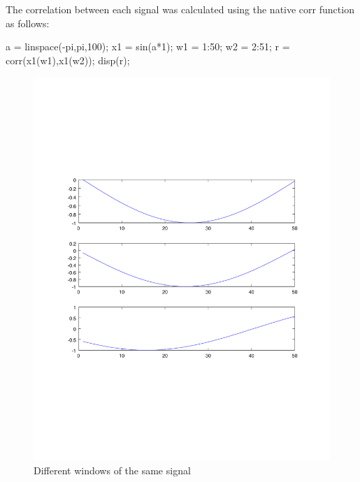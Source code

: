 The correlation between each signal was calculated using the native corr function as follows:

\begin{Matlab}
a = linspace(-pi,pi,100); %
x1  = sin(a*1); %
w1 = 1:50;
w2 = 2:51;
r = corr(x1(w1),x1(w2));
disp(r);
\end{Matlab}



\begin{figure}
\centering
\includegraphics[scale=0.4]{Figures/lofreq}
\caption{Different windows of the same signal}
\label{fig:windowslo100}




\end{figure}
